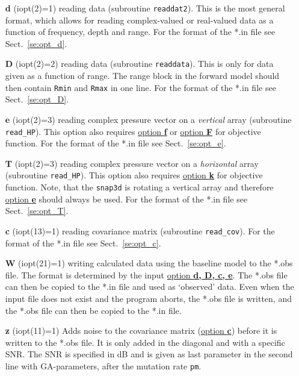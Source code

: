 \documentclass{saclantc}
\begin{document}
\vspace{-0.6cm}
\begin{itemize}
    \item[{\bf d}] (iopt(2)=1)   reading data (subroutine {\tt readdat2}).
This is the most general format, which allows for reading complex-valued or real-valued data as a function of frequency, depth and range.
For the format of the *.in file see Sect.\ \ref{se:opt_d}.
\vspace{-0.3cm}
    \item[{\bf D}] (iopt(2)=2)   reading  data (subroutine {\tt readdata}).
This is only for data given as a function of range. The range block in
the forward model should then contain {\tt Rmin} and {\tt Rmax} in one line.
For the format of the *.in file see Sect.\ \ref{se:opt_D}.
\vspace{-0.3cm}
    \item[{\bf e}] (iopt(2)=3)   reading complex pressure vector on a
      {\it vertical}
array (subroutine {\tt read\_HP}). This option also requires
\underline{option {\bf f}} or \underline{option {\bf F}} 
for objective function.
For the format of the *.in file see Sect.\ \ref{se:opt_e}.
\vspace{-0.3cm}
    \item[{\bf T}] (iopt(2)=3)   reading complex pressure vector on a
      {\it horizontal}
array (subroutine {\tt read\_HP}). This option also requires
\underline{option {\bf k}} for objective function.
Note, that the {\tt snap3d} is rotating a vertical array and therefore
   \underline{option {\bf e}} should always be used.
For the format of the *.in file see Sect.\ \ref{se:opt_T}.
\vspace{-0.3cm}
    \item[{\bf c}] (iopt(13)=1)   reading covariance matrix 
(subroutine {\tt read\_cov}).
For the format of the *.in file see Sect.\ \ref{se:opt_c}.
\vspace{-0.3cm}
    \item[{\bf W}] (iopt(21)=1) writing calculated data using
the baseline model to the *.obs file.
  The format is determined by the input \underline{option {\bf d, D, c, e}}.
The *.obs file can then be copied to the *.in  file and used as `observed'
data. Even when the input file does not exist and the program aborts,
the *.obs file  is written, and the *.obs file can then be copied to the *.in file.
\vspace{-0.3cm}
    \item[{\bf z}] (iopt(11)=1)
 Adds noise to the covariance matrix (\underline{option {\bf c}})
before it is written to the *.obs file.  
It is only added 
   in the diagonal and with a specific SNR.  The SNR is specified in dB
   and is given as last  parameter 
in the second line with GA-parameters, after the
   mutation rate {\tt pm}.


\end{itemize}
	
\end{document}
